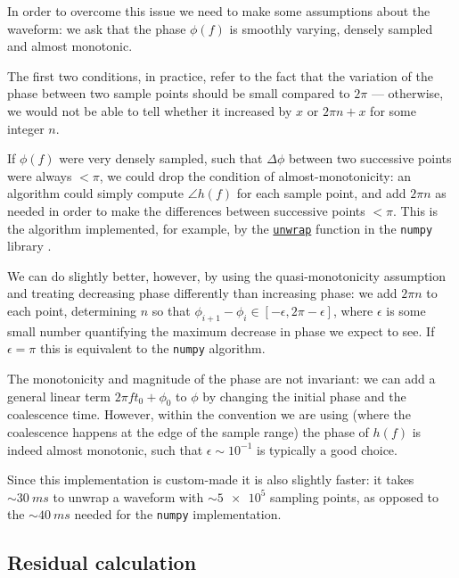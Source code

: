 \documentclass[main.tex]{subfiles}
\begin{document}
In order to overcome this issue we need to make some assumptions about the waveform: we ask that the phase \(\phi (f)\) is smoothly varying, densely sampled and almost monotonic. 

The first two conditions, in practice, refer to the fact that the variation of the phase between two sample points should be small compared to \(2 \pi \) --- otherwise, we would not be able to tell whether it increased by \(x\) or \(2 \pi n + x\) for some integer \(n\). 

If \(\phi (f)\) were very densely sampled, such that \(\Delta \phi \) between two successive points were always \(< \pi \), we could drop the condition of almost-monotonicity: an algorithm could simply compute \(\angle h(f)\) for each sample point, and add \(2 \pi n\) as needed in order to make the differences between successive points \(< \pi \). 
This is the algorithm implemented, for example, by the \href{https://numpy.org/doc/stable/reference/generated/numpy.unwrap.html}{\texttt{unwrap}} function in the \texttt{numpy} library \cite{harrisArrayProgrammingNumPy2020}.

We can do slightly better, however, by using the quasi-monotonicity assumption and treating decreasing phase differently than increasing phase: we add \(2 \pi n\) to each point, determining \(n\) so that \(\phi _{i+1} - \phi _i \in [- \epsilon , 2 \pi - \epsilon ]\), where \(\epsilon \) is some small number quantifying the maximum decrease in phase we expect to see.
If \(\epsilon = \pi \) this is equivalent to the \texttt{numpy} algorithm. 

The monotonicity and magnitude of the phase are not invariant: we can add a general linear term \(2 \pi f t_0 + \phi_0 \) to \(\phi \) by changing the initial phase and the coalescence time. 
However, within the convention we are using (where the coalescence happens at the edge of the sample range) the phase of \(h(f)\) is indeed almost monotonic, such that \(\epsilon \sim 10^{-1}\) is typically a good choice.

Since this implementation is custom-made it is also slightly faster: it takes \(\sim \SI{30}{ms}\) to unwrap a waveform with \(\sim \num{5e5}\) sampling points,  as opposed to the \(\sim \SI{40}{ms}\) needed for the \texttt{numpy} implementation. 

\subsection{Residual calculation} \label{sec:residuals}
\end{document}
